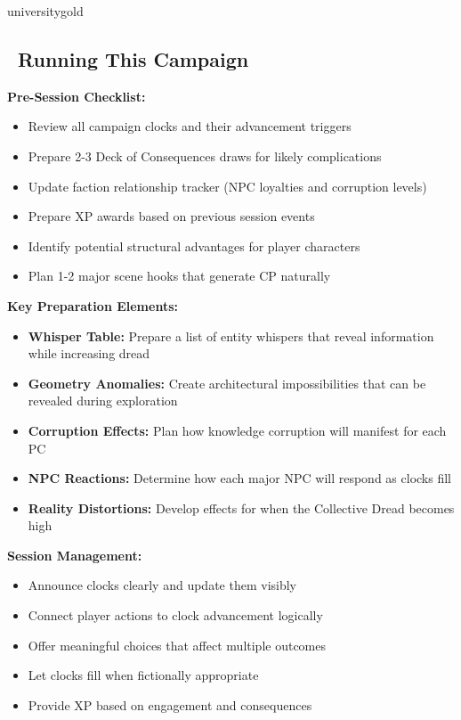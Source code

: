 \documentclass[11pt]{article}
\begin{document}
\begin{campaignsection}[GM Preparation]{universitygold}
\subsection*{\faDice\ Running This Campaign}

\textbf{Pre-Session Checklist:}
\begin{itemize}
    \item Review all campaign clocks and their advancement triggers
    \item Prepare 2-3 Deck of Consequences draws for likely complications
    \item Update faction relationship tracker (NPC loyalties and corruption levels)
    \item Prepare XP awards based on previous session events
    \item Identify potential structural advantages for player characters
    \item Plan 1-2 major scene hooks that generate CP naturally
\end{itemize}

\textbf{Key Preparation Elements:}
\begin{itemize}
    \item \textbf{Whisper Table:} Prepare a list of entity whispers that reveal information while increasing dread
    \item \textbf{Geometry Anomalies:} Create architectural impossibilities that can be revealed during exploration
    \item \textbf{Corruption Effects:} Plan how knowledge corruption will manifest for each PC
    \item \textbf{NPC Reactions:} Determine how each major NPC will respond as clocks fill
    \item \textbf{Reality Distortions:} Develop effects for when the Collective Dread becomes high
\end{itemize}

\textbf{Session Management:}
\begin{itemize}
    \item Announce clocks clearly and update them visibly
    \item Connect player actions to clock advancement logically
    \item Offer meaningful choices that affect multiple outcomes
    \item Let clocks fill when fictionally appropriate
    \item Provide XP based on engagement and consequences
\end{itemize}


\end{campaignsection}
\end{document}
